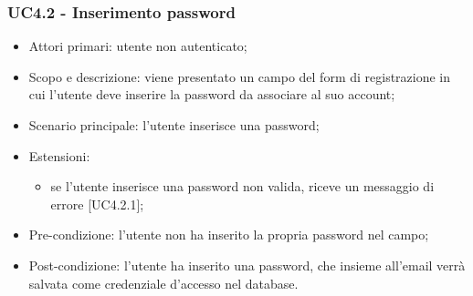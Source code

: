 \subsubsection{UC4.2 - Inserimento password}
\begin{itemize}
	\item  Attori primari: utente non autenticato;
	\item  Scopo e descrizione: viene presentato un campo del form di registrazione in cui l'utente deve inserire la password da associare al suo account;
	\item  Scenario principale: l'utente inserisce una password;	
	\item  Estensioni:
		   \begin{itemize}
				\item se l'utente inserisce una password non valida, riceve un messaggio di errore [UC4.2.1];
		   \end{itemize}
	\item  Pre-condizione: l'utente non ha inserito la propria password nel campo;
	\item  Post-condizione: l'utente ha inserito una password, che insieme all'email verrà salvata come credenziale d'accesso nel database.
\end{itemize}
